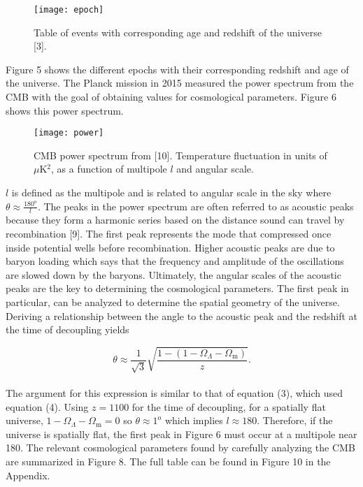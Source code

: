 \documentclass[12pt]{article}
\begin{document}
\begin{figure}[h]
    \centering
    \texttt{[image: epoch]}
    \caption{Table of events with corresponding age and redshift of the universe [3].}
    \label{fig:mesh1}
\end{figure}

\noindent Figure 5 shows the different epochs with their corresponding redshift and age of the universe. The Planck mission in 2015 measured the power spectrum from the CMB with the goal of obtaining values for cosmological parameters. Figure 6 shows this power spectrum.\\


\begin{figure}[h]
    \centering
    \texttt{[image: power]}
    \caption{CMB power spectrum from [10]. Temperature fluctuation in units of $\mu$K$^2$, as a function of multipole $l$ and angular scale.}
    \label{fig:mesh1}
\end{figure}
	
$l$ is defined as the multipole and is related to angular scale in the sky where $\theta \approx \frac{180^\text{o}}{l}$. The peaks in the power spectrum are often referred to as acoustic peaks because they form a harmonic series based on the distance sound can travel by recombination [9]. The first peak represents the mode that compressed once inside potential wells before recombination. Higher acoustic peaks are due to baryon loading which says that the frequency and amplitude of the oscillations are slowed down by the baryons. Ultimately, the angular scales of the acoustic peaks are the key to determining the cosmological parameters. The first peak in particular, can be analyzed to determine the spatial geometry of the universe. Deriving a relationship between the angle to the acoustic peak and the redshift at the time of decoupling yields

\begin{equation}
\theta \approx \frac{1}{\sqrt{3}} \sqrt{ \frac{1-(1-\Omega_\Lambda - \Omega_\text{m})}{z} }.
\end{equation}
\\
\noindent The argument for this expression is similar to that of equation (3), which used equation (4). Using $z=1100$ for the time of decoupling, for a spatially flat universe, $1-\Omega_\Lambda - \Omega_\text{m}=0$ so $\theta \approx 1^\text{o}$ which implies $l \approx 180$. Therefore, if the universe is spatially flat, the first peak in Figure 6 must occur at a multipole near 180. The relevant cosmological parameters found by carefully analyzing the CMB are summarized in Figure 8. The full table can be found in Figure 10 in the Appendix.
\end{document}
